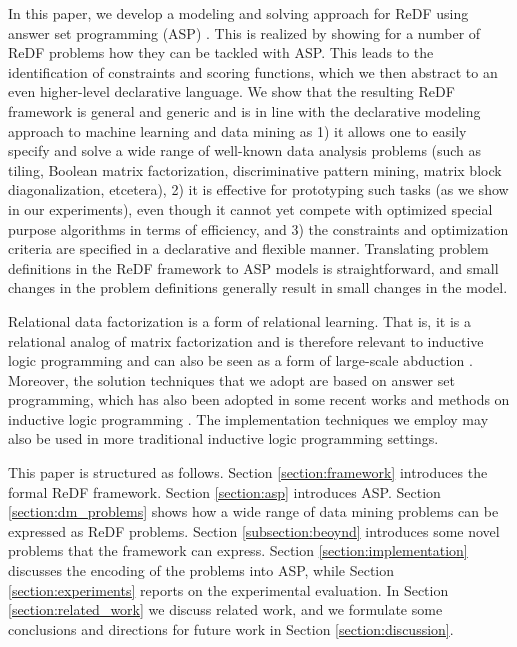 In this paper, we develop a modeling and solving approach for ReDF using answer set programming (ASP) \parencite{BrewkaCACM}. This is realized by showing for a number of ReDF problems how they can be tackled with ASP.  
This leads to the identification of constraints and scoring functions, which we then abstract to an even higher-level declarative language. 
We show that the resulting ReDF framework is general and generic and is in line with 
  the declarative modeling approach to machine learning and data mining as 
  1) it allows one to easily specify and solve a wide range of well-known data analysis problems (such as tiling, Boolean matrix factorization, discriminative pattern mining, matrix block diagonalization, etcetera),
  2) it is effective for prototyping such tasks (as we show in our experiments), even though it cannot yet compete with optimized special purpose algorithms in terms of efficiency, and 
  3) the constraints and optimization criteria are specified in a declarative and flexible manner. 
  Translating problem definitions in the ReDF framework to ASP models is straightforward, and small changes in the problem definitions generally result in small changes in the model. 
%

  Relational data factorization is a form of relational learning. That is, it is a relational analog of matrix factorization and is therefore relevant to inductive logic programming \parencite{ilp_theory_methods,luc_book} and can also be seen as a form of large-scale abduction \parencite{abduction}. Moreover, the solution techniques that we adopt are based on answer set programming, which has also been adopted in some recent works and methods on inductive logic programming \parencite{ilp_graph_mining,DBLP:conf/lpnmr/Jarvisalo11}. The implementation techniques we employ may also be used in more traditional inductive logic programming settings.

  This paper is structured as follows. Section \ref{section:framework} introduces the formal ReDF framework. Section \ref{section:asp} introduces ASP. Section \ref{section:dm_problems} shows how a wide range of data mining problems can be expressed as ReDF problems. Section \ref{subsection:beoynd} introduces some novel problems that the framework can express. Section \ref{section:implementation} discusses the encoding of the problems into ASP, while Section \ref{section:experiments} reports on the experimental evaluation. In Section \ref{section:related_work} we discuss related work, and we formulate some conclusions and directions for future work in Section \ref{section:discussion}. 
